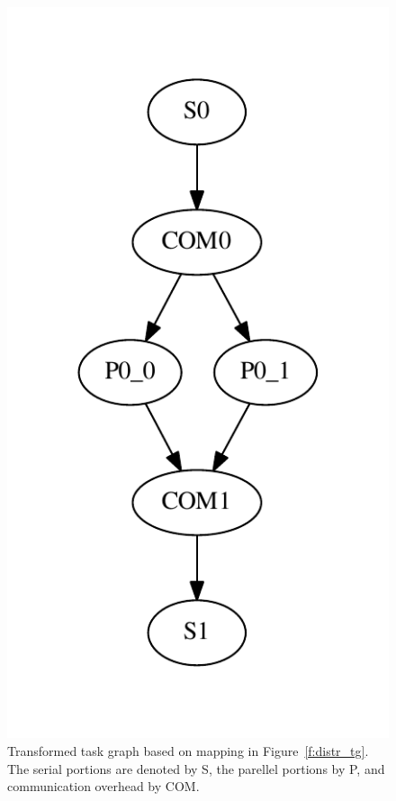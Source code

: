 \documentclass[table,11pt]{article}
\begin{document}
\begin{figure}[ht]
\centering
\includegraphics[scale=0.5]{figures/trans_cfg}
\caption{Transformed task graph based on mapping in Figure~\ref{f:distr_tg}. The serial portions are denoted by S, the parellel portions by P, and communication overhead by COM.}
\label{f:trans_cfg}
\end{figure}
\end{document}
